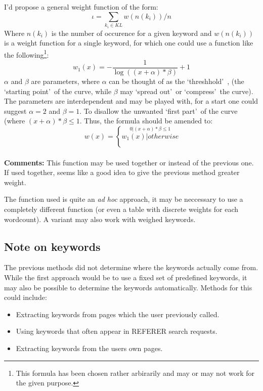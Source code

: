 \documentclass[a4paper]{danarticle}
\begin{document}
       I'd propose a general weight function of the form:
       \[
         \iota = \sum_{k_i \in KL} w(n(k_i))/n
       \]
       Where $ n(k_i) $ is the number of occurence for a given keyword and
       $ w(n(k_i)) $ is a weight function for a single keyword, for which one
       could use a function like the following\footnote{This formula has been
       chosen rather arbirarily and may or may not work for the given purpose.}:
       \[
         w_1(x) = - \frac{1}{\log((x + \alpha) * \beta)} +1
       \]
       $ \alpha $ and $ \beta $ are parameters, where $ \alpha $
       can be thought of as the \lq threshhold\rq\ , (the \lq starting point\rq\
       of the curve, while $ \beta $ may \lq spread out\rq\ or \lq compress\rq\ 
       the curve). The parameters are interdependent and may be played with,
       for a start one could suggest $ \alpha = 2 $ and $ \beta = 1 $. To
       disallow the unwanted \lq first part\rq\ of the curve (where 
       $ (x+ \alpha) * \beta \leq 1 $. Thus, the formula should be amended to:
       \[
         w(x) = \left \{ 
	 \stackrel{0 | (x + \alpha) * \beta \leq 1}{w_1(x) | otherwise}
	 \right.
       \]
       \\
       \textbf{Comments:} This function may be used together or instead of the
       previous one. If used together, seems like a good idea to give the
       previous method greater weight. 
       
       The function used is quite an \textit{ad hoc} approach, it may be
       neccessary to use a completely different function (or even a table with
       discrete weights for each wordcount). A variant may also work with
       weighed keywords.
     \subsection*{Note on keywords}
       The previous methods did not determine where the keywords actually come
       from. While the first approach would be to use a fixed set of predefined
       keywords, it may also be possible to determine the keywords
       automatically. Methods for this could include:
       \begin{itemize}
         \item{Extracting keywords from pages which the user previously
	 called.}
	 \item{Using keywords that often appear in REFERER search requests.}
	 \item{Extracting keywords from the users own pages.}
       \end{itemize}
\end{document}
